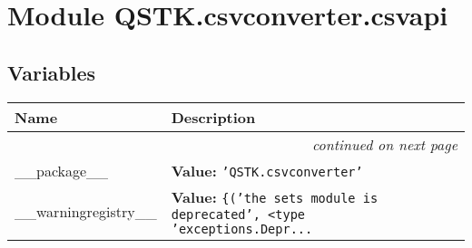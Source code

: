 %
%
%


\section{Module QSTK.csvconverter.csvapi}

    \label{QSTK:csvconverter:csvapi}


  \subsection{Variables}

    \vspace{-1cm}
\hspace{\varindent}\begin{longtable}{|p{\varnamewidth}|p{\vardescrwidth}|l}
\cline{1-2}
\cline{1-2} \centering \textbf{Name} & \centering \textbf{Description}& \\
\cline{1-2}
\endhead\cline{1-2}\multicolumn{3}{r}{\small\textit{continued on next page}}\\\endfoot\cline{1-2}
\endlastfoot\raggedright \_\-\_\-p\-a\-c\-k\-a\-g\-e\-\_\-\_\- & \raggedright \textbf{Value:} 
{\tt \texttt{'}\texttt{QSTK.csvconverter}\texttt{'}}&\\
\cline{1-2}
\raggedright \_\-\_\-w\-a\-r\-n\-i\-n\-g\-r\-e\-g\-i\-s\-t\-r\-y\-\_\-\_\- & \raggedright \textbf{Value:} 
{\tt \texttt{\{}\texttt{(}\texttt{'}\texttt{the sets module is deprecated}\texttt{'}\texttt{, }{\textless}type 'exceptions.Depr\texttt{...}}&\\
\cline{1-2}
\end{longtable}




